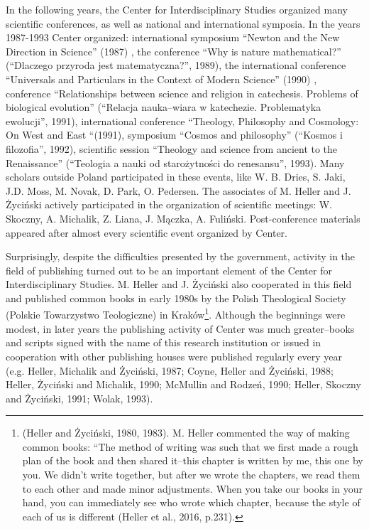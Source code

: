 \documentclass[a4paper]{article}
\begin{document}
In the following years, the Center for Interdisciplinary Studies organized many scientific conferences, as well as
national and international symposia. In the years 1987-1993 Center organized: international symposium “Newton and the
New Direction in Science” (1987) , the conference “Why is nature mathematical?” (“Dlaczego przyroda jest
matematyczna?”, 1989), the international conference “Universals and Particulars in the Context of Modern Science”
(1990) , conference “Relationships between science and religion in catechesis. Problems of biological evolution”
(“Relacja nauka–wiara w katechezie. Problematyka ewolucji”, 1991), international conference “Theology, Philosophy and
Cosmology: On West and East “(1991), symposium “Cosmos and philosophy” (“Kosmos i filozofia”, 1992), scientific session
“Theology and science from ancient to the Renaissance” (“Teologia a nauki od starożytności do renesansu”, 1993). Many
scholars outside Poland participated in these events, like W. B. Dries, S. Jaki, J.D. Moss, M. Novak, D. Park, O.
Pedersen. The associates of M. Heller and J. Życiński actively participated in the organization of scientific meetings:
W. Skoczny, A. Michalik, Z. Liana, J. Mączka, A. Fuliński. Post-conference materials appeared after almost every
scientific event organized by Center.

Surprisingly, despite the difficulties presented by the government, activity in the field of publishing turned out to be
an important element of the Center for Interdisciplinary Studies. M. Heller and J. Życiński also cooperated in this
field and published common books in early 1980s by the Polish Theological Society (Polskie Towarzystwo Teologiczne) in
Kraków\footnote{ \label{ref:RNDTf5nBbodTA}(Heller and Życiński, 1980, 1983). M. Heller commented the way of making
common books: “The method of writing was such that we first made a rough plan of the book and then shared it–this
chapter is written by me, this one by you. We didn't write together, but after we wrote the chapters, we read them to
each other and made minor adjustments. When you take our books in your hand, you can immediately see who wrote which
chapter, because the style of each of us is different \label{ref:RNDN8kH0OpdBK}(Heller et al., 2016, p.231).}. Although
the beginnings were modest, in later years the publishing activity of Center was much greater–books and scripts signed
with the name of this research institution or issued in cooperation with other publishing houses were published
regularly every year \label{ref:RND0fapg56Vka}(e.g. Heller, Michalik and Życiński, 1987; Coyne, Heller and Życiński,
1988; Heller, Życiński and Michalik, 1990; McMullin and Rodzeń, 1990; Heller, Skoczny and Życiński, 1991; Wolak, 1993).
\end{document}
